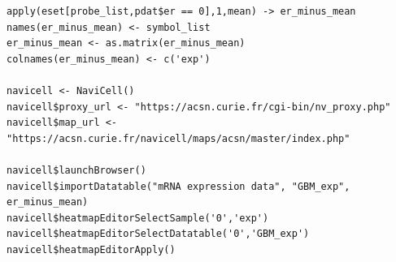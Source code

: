 \documentclass[article]{jss}
\begin{document}
\begin{verbatim}
apply(eset[probe_list,pdat$er == 0],1,mean) -> er_minus_mean
names(er_minus_mean) <- symbol_list
er_minus_mean <- as.matrix(er_minus_mean)
colnames(er_minus_mean) <- c('exp')

navicell <- NaviCell()
navicell$proxy_url <- "https://acsn.curie.fr/cgi-bin/nv_proxy.php"
navicell$map_url <- "https://acsn.curie.fr/navicell/maps/acsn/master/index.php"

navicell$launchBrowser()
navicell$importDatatable("mRNA expression data", "GBM_exp", er_minus_mean)
navicell$heatmapEditorSelectSample('0','exp')
navicell$heatmapEditorSelectDatatable('0','GBM_exp')
navicell$heatmapEditorApply()
\end{verbatim}



%

\end{document}
